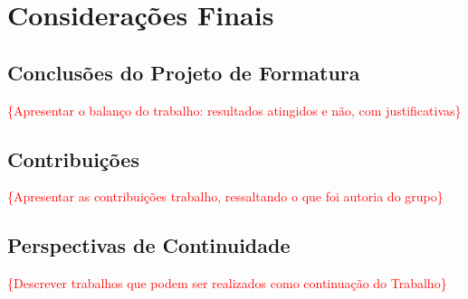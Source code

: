 \chapter{Considerações Finais}


\section{Conclusões do Projeto de Formatura}
\textcolor{red}{\{Apresentar o balanço do trabalho: resultados atingidos e não, com justificativas\}}

\section{Contribuições}
\textcolor{red}{\{Apresentar as contribuições  trabalho, ressaltando o que foi autoria do grupo\}}

\section{Perspectivas de Continuidade}
\textcolor{red}{\{Descrever trabalhos que podem ser realizados como continuação do Trabalho\}}

